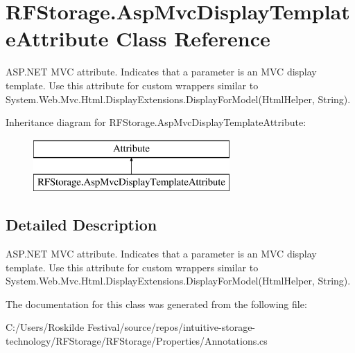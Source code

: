 \hypertarget{class_r_f_storage_1_1_asp_mvc_display_template_attribute}{}\section{R\+F\+Storage.\+Asp\+Mvc\+Display\+Template\+Attribute Class Reference}
\label{class_r_f_storage_1_1_asp_mvc_display_template_attribute}


A\+S\+P.\+N\+ET M\+VC attribute. Indicates that a parameter is an M\+VC display template. Use this attribute for custom wrappers similar to {\ttfamily System.\+Web.\+Mvc.\+Html.\+Display\+Extensions.\+Display\+For\+Model(\+Html\+Helper, String)}.  


Inheritance diagram for R\+F\+Storage.\+Asp\+Mvc\+Display\+Template\+Attribute\+:\begin{figure}[H]
\begin{center}
\leavevmode
\includegraphics[height=2.000000cm]{class_r_f_storage_1_1_asp_mvc_display_template_attribute}
\end{center}
\end{figure}


\subsection{Detailed Description}
A\+S\+P.\+N\+ET M\+VC attribute. Indicates that a parameter is an M\+VC display template. Use this attribute for custom wrappers similar to {\ttfamily System.\+Web.\+Mvc.\+Html.\+Display\+Extensions.\+Display\+For\+Model(\+Html\+Helper, String)}. 



The documentation for this class was generated from the following file\+:\begin{DoxyCompactItemize}
\item 
C\+:/\+Users/\+Roskilde Festival/source/repos/intuitive-\/storage-\/technology/\+R\+F\+Storage/\+R\+F\+Storage/\+Properties/Annotations.\+cs\end{DoxyCompactItemize}
